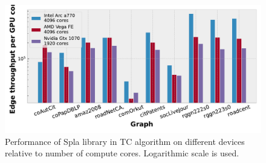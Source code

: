 \begin{figure}[]
\centering
\includegraphics[width=0.95\linewidth]{plots/rq2_cores_tc.pdf}
\caption{Performance of Spla library in TC algorithm on different devices relative to number of compute cores. Logarithmic scale is used.}
\label{fig:rq_tc}
\end{figure}


